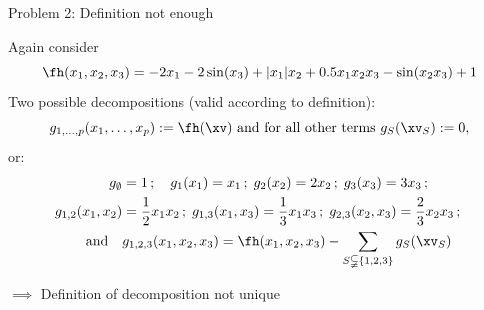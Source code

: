 \documentclass[11pt,compress,t,notes=noshow, aspectratio=169, xcolor=table]{beamer}
\begin{document}
\begin{frame}{Problem 2: Definition not enough}

    \begin{example}
        Again consider
        $$
        \fh(x_1, x_2, x_3) = - 2x_1 - 2\sin(x_3) + |x_1|x_2 + 0.5 x_1 x_2 x_3 - \sin(x_2 x_3) + 1
        $$
        \pause
        Two possible decompositions (valid according to definition):
        $$
            g_{1, \dots, p}(x_1, \dots, x_p) := \fh(\xv) \text{ and for all other terms } g_S(\xv_S) := 0 ,
        $$
        or:
        \begin{align*}
            g_\emptyset & = 1 \,;\quad
            g_1(x_1) = x_1 \,;\;
            g_2(x_2) = 2x_2 \,;\;
            g_3(x_3) = 3x_3 \,;\quad \\
            g_{1,2}(x_1, x_2) & = \frac{1}{2} x_1 x_2 \,;\;
            g_{1,3}(x_1, x_3) = \frac{1}{3} x_1 x_3 \,;\;
            g_{2,3}(x_2, x_3) = \frac{2}{3} x_2 x_3 \,;\; \\
            \text{ and} \quad
            & g_{1,2,3}(x_1, x_2, x_3) = \fh(x_1, x_2, x_3) - \sum_{S \subsetneqq \{1,2,3\}} g_S(\xv_S)
        \end{align*}
    \end{example}
    \pause
    \(\implies\) Definition of decomposition not unique \\
    
\end{frame}
\end{document}
